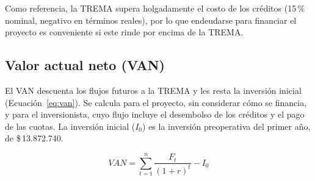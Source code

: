         Como referencia, la TREMA supera holgadamente el costo de los créditos (15\,\% nominal, negativo en términos reales), por lo que endeudarse para financiar el proyecto es conveniente si este rinde por encima de la TREMA.

    \subsection{Valor actual neto (VAN)}

        El VAN descuenta los flujos futuros a la TREMA y les resta la inversión inicial (Ecuación~\ref{eq:van}). Se calcula para el proyecto, sin considerar cómo se financia, y para el inversionista, cuyo flujo incluye el desembolso de los créditos y el pago de las cuotas. La inversión inicial ($I_0$) es la inversión preoperativa del primer año, de \$\,13.872.740.

        \begin{equation}
            VAN = \sum_{t=1}^{n}\frac{F_{t}}{(1+r)^{t}} - I_{0}
            \label{eq:van}
        \end{equation}

